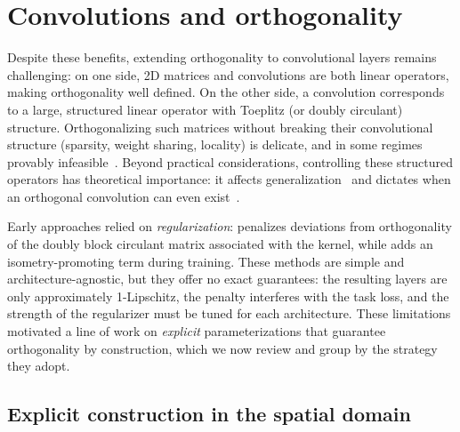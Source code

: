\section{Convolutions and orthogonality}

    Despite these benefits, extending orthogonality to convolutional layers remains challenging: on one side, 2D matrices and convolutions are both linear operators, making orthogonality well defined. On the other side, a convolution corresponds to a large, structured linear operator with Toeplitz (or doubly circulant) structure. Orthogonalizing such matrices without breaking their convolutional structure (sparsity, weight sharing, locality) is delicate, and in some regimes provably infeasible~\cite{achour2023existencestabilityscalabilityorthogonal}. Beyond practical considerations, controlling these structured operators has theoretical importance: it affects generalization~\cite{bethune_pay_2022} and dictates when an orthogonal convolution can even exist~\cite{achour2023existencestabilityscalabilityorthogonal}.

    Early approaches relied on \emph{regularization}: \cite{wang_orthogonal_2020} penalizes deviations from orthogonality of the doubly block circulant matrix associated with the kernel, while \cite{qi_deep_isometric_2020} adds an isometry-promoting term during training. These methods are simple and architecture-agnostic, but they offer no exact guarantees: the resulting layers are only approximately 1-Lipschitz, the penalty interferes with the task loss, and the strength of the regularizer must be tuned for each architecture. These limitations motivated a line of work on \emph{explicit} parameterizations that guarantee orthogonality by construction, which we now review and group by the strategy they adopt.

    \subsection{Explicit construction in the spatial domain}

